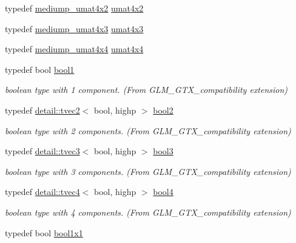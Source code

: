 \begin{DoxyCompactItemize}
typedef \hyperlink{group__gtc__matrix__integer_ga8ea45737e8bc9bfae2668968056b109f}{mediump\+\_\+umat4x2} \hyperlink{group__gtc__matrix__integer_ga13e8392218e9b6e1b7f194a21b5c88bf}{umat4x2}
\item 
typedef \hyperlink{group__gtc__matrix__integer_gaebe3b1b4b6030c096447e40fb00528f4}{mediump\+\_\+umat4x3} \hyperlink{group__gtc__matrix__integer_ga08373f5588a54da1a48e5e55c7d51004}{umat4x3}
\item 
typedef \hyperlink{group__gtc__matrix__integer_ga24b1c76fefa58f810e24cafe0ea6a6a0}{mediump\+\_\+umat4x4} \hyperlink{group__gtc__matrix__integer_gae0931b79e808fb0983848778a60eb548}{umat4x4}
\item 
typedef bool \hyperlink{group__gtx__compatibility_gab65f19f5170f95a2f06d6aa6482c9405}{bool1}
\begin{DoxyCompactList}\small\item\em boolean type with 1 component. (From G\+L\+M\+\_\+\+G\+T\+X\+\_\+compatibility extension) \end{DoxyCompactList}\item 
typedef \hyperlink{structglm_1_1detail_1_1tvec2}{detail\+::tvec2}$<$ bool, highp $>$ \hyperlink{group__gtx__compatibility_gafede6e8549e9bb9da63f404022298d40}{bool2}
\begin{DoxyCompactList}\small\item\em boolean type with 2 components. (From G\+L\+M\+\_\+\+G\+T\+X\+\_\+compatibility extension) \end{DoxyCompactList}\item 
typedef \hyperlink{structglm_1_1detail_1_1tvec3}{detail\+::tvec3}$<$ bool, highp $>$ \hyperlink{group__gtx__compatibility_gad18ebb149851844fd704e138c4af9a44}{bool3}
\begin{DoxyCompactList}\small\item\em boolean type with 3 components. (From G\+L\+M\+\_\+\+G\+T\+X\+\_\+compatibility extension) \end{DoxyCompactList}\item 
typedef \hyperlink{structglm_1_1detail_1_1tvec4}{detail\+::tvec4}$<$ bool, highp $>$ \hyperlink{group__gtx__compatibility_ga6ef1f104d22f384c4d59f2b1ca1768a7}{bool4}
\begin{DoxyCompactList}\small\item\em boolean type with 4 components. (From G\+L\+M\+\_\+\+G\+T\+X\+\_\+compatibility extension) \end{DoxyCompactList}\item 
typedef bool \hyperlink{group__gtx__compatibility_ga98d9d3da22aebc872ba38ce5afa0eff7}{bool1x1}

\end{DoxyCompactItemize}
